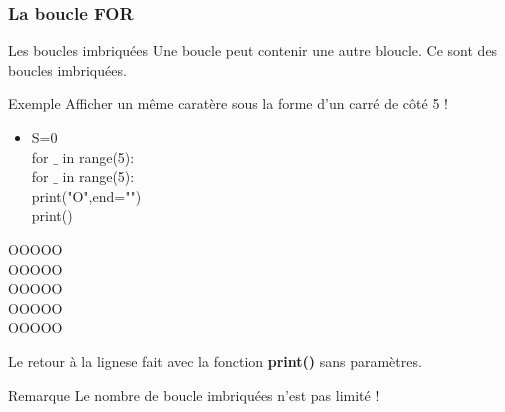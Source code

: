 \documentclass[8pt]{beamer}
\begin{document}
\begin{frame}
\frametitle{La boucle FOR}

\begin{block}{Les boucles imbriquées}
Une boucle peut contenir une autre bloucle. Ce sont des boucles imbriquées.
\end{block}

\begin{exampleblock}{Exemple}
Afficher un même caratère sous la forme d'un carré de côté 5 !\medskip

\begin{minipage}{0.45\textwidth}
\begin{itemize}
\item S=0\\
for $\_$ in range(5):\\
\hspace{0.5cm}for $\_$ in range(5):\\
\hspace{1cm}print("O",end="")\\
\hspace{0.45cm}print()
\end{itemize}
\end{minipage}\hfill
\begin{minipage}{0.5\textwidth}
\begin{center}
OOOOO\\
OOOOO\\
OOOOO\\
OOOOO\\
OOOOO
\end{center}
\end{minipage}

\medskip
Le retour à la lignese fait avec la fonction \textbf{print()} sans paramètres.
\end{exampleblock}

\begin{alertblock}{Remarque}
Le nombre de boucle imbriquées n'est pas limité !
\end{alertblock}

\end{frame}
\end{document}
